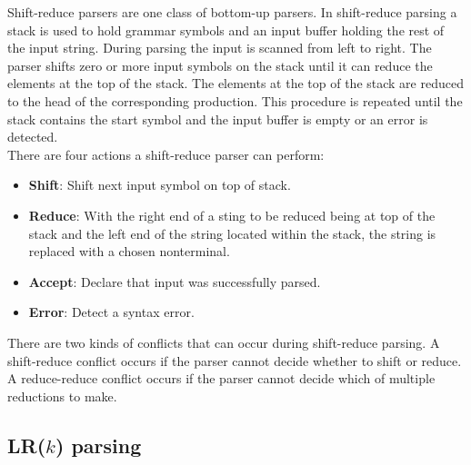 Shift-reduce parsers are one class of bottom-up parsers. In shift-reduce parsing a stack is used to hold grammar symbols and an input buffer holding the rest of the input string.
During parsing the input is scanned from left to right. The parser shifts zero or more input symbols on the stack until it can reduce the elements at the top of the stack. The elements at the top of the stack are reduced to the head of the corresponding production. This procedure is repeated until the stack contains the start symbol and the input buffer is empty or an error is detected. \cite{Aho.2007}\\
There are four actions a shift-reduce parser can perform:
\begin{itemize}%
	\item \textbf{Shift}: Shift next input symbol on top of stack.
	\item \textbf{Reduce}: With the right end of a sting to be reduced being at top of the stack and the left end of the string located within the stack, the string is replaced with a  chosen nonterminal.
	\item \textbf{Accept}: Declare that input was successfully parsed.
	\item \textbf{Error}: Detect a syntax error.
\end{itemize}
\cite{Aho.2007}


There are two kinds of conflicts that can occur during shift-reduce parsing. A shift-reduce conflict occurs if the parser cannot decide whether to shift or reduce.
A reduce-reduce conflict occurs if the parser cannot decide which of multiple reductions to make.\cite{Aho.2007}


\subsection{LR($k$) parsing}\label{sec:BackgroundParserLR}

